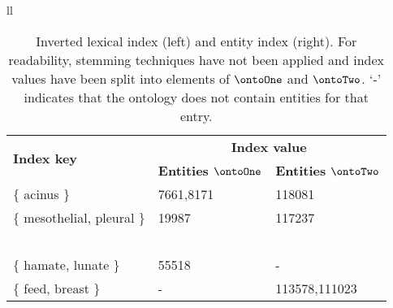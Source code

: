 \begin{table*}[t!]
\caption{Inverted lexical index \lex (left) and entity index (right). For readability,
stemming techniques have not been applied and index values have been split into elements of $\ontoOne$ and $\ontoTwo$. `-'
indicates that the ontology does not contain entities for that  
entry.}\label{table:ext_if}%
\vspace{-0.1cm}
\centering
{

\begin{tabular}{ll}
\begin{footnotesize}
\begin{tabular}[t]{|l||l|l|}
\hline 

\multirow{2}{*}{\textbf{Index key}} & \multicolumn{2}{c|}{\textbf{Index value}}
\\\cline{2-3} 
& \textbf{Entities $\ontoOne$} & \textbf{Entities $\ontoTwo$} \\\hline

$\{$ acinus $\}$ & 7661,8171 & 118081 \\\hline

$\{$ mesothelial, pleural $\}$ & 19987 & 117237 \\\hline
 \multicolumn{3}{c}{\tiny{~}\vspace{-0.21cm}} \\\hline

$\{$ hamate, lunate $\}$ & 55518 & - \\\hline

$\{$ feed, breast $\}$ & - & 113578,111023 \\\hline







\end{tabular}
\end{footnotesize}
\end{tabular}}
\end{table*}
